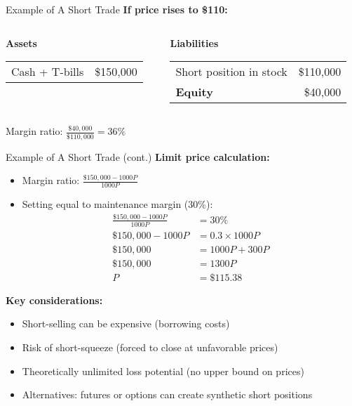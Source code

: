 \documentclass[10pt]{beamer}
\begin{document}
\begin{frame}{Example of A Short Trade}
  \textbf{If price rises to \$110:}
  \begin{columns}
    \begin{column}{0.48\textwidth}
      \textbf{Assets} \vspace{0.2em}\\
      \begin{tabular}{lr}
        Cash + T-bills & \$150,000 \\
      \end{tabular}
    \end{column}
    \begin{column}{0.48\textwidth}
      \textbf{Liabilities} \vspace{0.2em}\\
      \begin{tabular}{lr}
        Short position in stock & \$110,000 \\[0.5em]
        \textbf{Equity} & \$40,000 \\
      \end{tabular}
    \end{column}
  \end{columns}
  
  Margin ratio: $\tfrac{\$40,000}{\$110,000} = 36\%$
\end{frame}

\begin{frame}{Example of A Short Trade (cont.)}
  \textbf{Limit price calculation:}
  \begin{itemize}
    \item Margin ratio: $\tfrac{\$150,000 - 1000P}{1000P}$
    \item Setting equal to maintenance margin (30\%):
    \begin{align*}
      \tfrac{\$150,000 - 1000P}{1000P} &= 30\%\\
      \$150,000 - 1000P &= 0.3 \times 1000P\\
      \$150,000 &= 1000P + 300P\\
      \$150,000 &= 1300P\\
      P &= \$115.38
    \end{align*}
  \end{itemize}
  
  \pause
  \textbf{Key considerations:}
  \begin{itemize}
    \item Short-selling can be expensive (borrowing costs)
    \item Risk of short-squeeze (forced to close at unfavorable prices)
    \item Theoretically unlimited loss potential (no upper bound on prices)
    \item Alternatives: futures or options can create synthetic short positions
  \end{itemize}
\end{frame}
\end{document}
